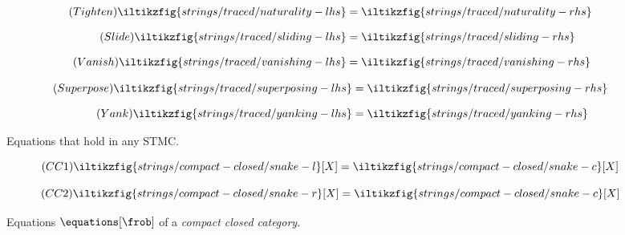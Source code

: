 \begin{figure}[p]
    \centering
    \begin{minipage}{0.52\textwidth}
        \begin{align*}
            \tag{\(\mathsf{Tighten}\)}
            \iltikzfig{strings/traced/naturality-lhs}
            &=
            \iltikzfig{strings/traced/naturality-rhs}
            \label{eq:tightening}
            \\[0.75em]
            \tag{\(\mathsf{Slide}\)}
            \iltikzfig{strings/traced/sliding-lhs}
            &=
            \iltikzfig{strings/traced/sliding-rhs}
            \label{eq:sliding}
            \\[0.75em]
            \tag{\(\mathsf{Vanish}\)}
            \iltikzfig{strings/traced/vanishing-lhs}
            &=
            \iltikzfig{strings/traced/vanishing-rhs}
            \label{eq:vanishing}
        \end{align*}
    \end{minipage}
    \hspace{-1em}
    \begin{minipage}{0.455\textwidth}
        \begin{align*}
            \tag{\(\mathsf{Superpose}\)}
            \iltikzfig{strings/traced/superposing-lhs}
            &=
            \iltikzfig{strings/traced/superposing-rhs}
            \label{eq:superposing}
            \\[0.75em]
            \tag{\(\mathsf{Yank}\)}
            \iltikzfig{strings/traced/yanking-lhs}
            &=
            \iltikzfig{strings/traced/yanking-rhs}
            \label{eq:yanking}
        \end{align*}
    \end{minipage}
    \caption{Equations that hold in any STMC.}
    \label{fig:stmc-axioms}
\end{figure}
\begin{figure}[p]
    \centering
    \begin{minipage}{0.29\textwidth}
        \begin{equation}
            \tag{\(\mathsf{CC1}\)}
            \iltikzfig{strings/compact-closed/snake-l}[X]
            =
            \iltikzfig{strings/compact-closed/snake-c}[X]
            \label{eq:snake-l}
        \end{equation}
    \end{minipage}
    \begin{minipage}{0.29\textwidth}
        \begin{equation}
            \tag{\(\mathsf{CC2}\)}
            \iltikzfig{strings/compact-closed/snake-r}[X]
            =
            \iltikzfig{strings/compact-closed/snake-c}[X]
            \label{eq:snake-r}
        \end{equation}
    \end{minipage}
    \caption{
        Equations \(\equations[\frob]\) of a \emph{compact closed category}.
    }
    \label{fig:ccc-axioms}
\end{figure}
